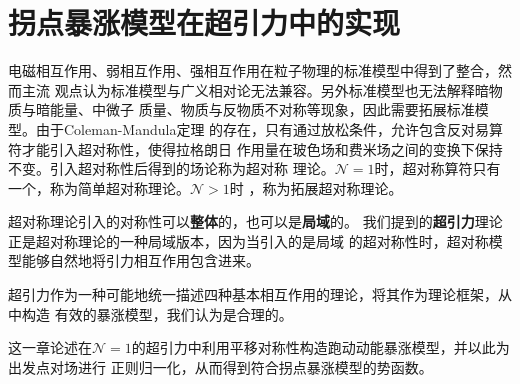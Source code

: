 \chapter{拐点暴涨模型在超引力中的实现}%
\label{chap:inflection_model}
电磁相互作用、弱相互作用、强相互作用在粒子物理的标准模型中得到了整合，然而主流
观点认为标准模型与广义相对论无法兼容。另外标准模型也无法解释暗物质与暗能量、中微子
质量、物质与反物质不对称等现象，因此需要拓展标准模型。由于Coleman-Mandula定理
的存在，只有通过放松条件，允许包含反对易算符才能引入超对称性，使得拉格朗日
作用量在玻色场和费米场之间的变换下保持不变。引入超对称性后得到的场论称为超对称
理论。$\mathcal{N}=1$时，超对称算符只有一个，称为简单超对称理论。$\mathcal{N}>1$时
，称为拓展超对称理论。

超对称理论引入的对称性可以\textbf{整体}的，也可以是\textbf{局域}的。
我们提到的\textbf{超引力}理论正是超对称理论的一种局域版本，因为当引入的是局域
的超对称性时，超对称模型能够自然地将引力相互作用包含进来。

超引力作为一种可能地统一描述四种基本相互作用的理论，将其作为理论框架，从中构造
有效的暴涨模型，我们认为是合理的。

这一章论述在$\mathcal{N}=1$的超引力中利用平移对称性构造跑动动能暴涨模型，并以此为出发点对场进行
正则归一化，从而得到符合拐点暴涨模型的势函数。




